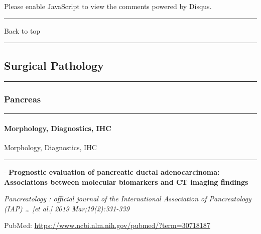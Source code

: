 \documentclass[]{article}
\let\oldparagraph\paragraph
\renewcommand{\paragraph}[1]{\oldparagraph{#1}\mbox{}}
\begin{document}
Please enable JavaScript to view the comments powered by Disqus.

\begin{center}\rule{0.5\linewidth}{\linethickness}\end{center}

Back to top

\begin{center}\rule{0.5\linewidth}{\linethickness}\end{center}

\pagebreak

\hypertarget{surgical-pathology}{%
\subsection{Surgical Pathology}\label{surgical-pathology}}

\begin{center}\rule{0.5\linewidth}{\linethickness}\end{center}

\hypertarget{pancreas}{%
\subsubsection{Pancreas}\label{pancreas}}

\begin{center}\rule{0.5\linewidth}{\linethickness}\end{center}

\hypertarget{morphology-diagnostics-ihc}{%
\paragraph{Morphology, Diagnostics,
IHC}\label{morphology-diagnostics-ihc}}

Morphology, Diagnostics, IHC

\begin{center}\rule{0.5\linewidth}{\linethickness}\end{center}

 - \textbf{Prognostic evaluation of pancreatic ductal adenocarcinoma:
Associations between molecular biomarkers and CT imaging findings}

\emph{Pancreatology : official journal of the International Association
of Pancreatology (IAP) \ldots{} {[}et al.{]} 2019 Mar;19(2):331-339}

PubMed: \url{https://www.ncbi.nlm.nih.gov/pubmed/?term=30718187}
\end{document}
